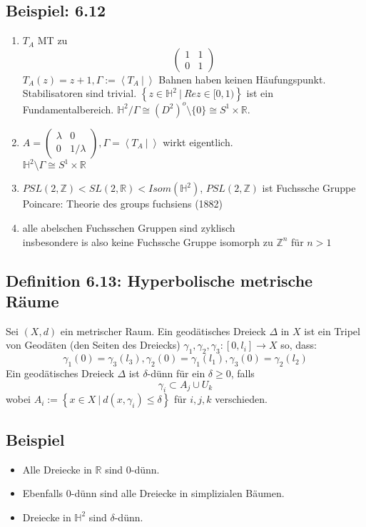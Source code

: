 \documentclass{article}
\newcommand{\Z}{\mathbb{Z}}
\newcommand{\R}{\mathbb{R}}
\renewcommand{\H}{\mathbb{H}}
\newcommand{\set}[2]{\left\lbrace #1~|~#2 \right\rbrace}
\newcommand{\grp}[2]{\left\langle #1~|~#2 \right\rangle}
\newcommand{\Matrix}[4]{\left(\begin{matrix}
		#1 & #2\\
		#3 & #4
	\end{matrix}\right)}
\begin{document}
\subsection{Beispiel: 6.12}
\begin{enumerate}
	\item $T_A$ MT zu 
	\[\Matrix{1}{1}{0}{1} \]
	$T_A(z) = z +1, \Gamma:= \grp{T_A}{}$
	Bahnen haben keinen Häufungspunkt. Stabilisatoren sind trivial. $\set{z \in \H^2}{Re z \in [0,1)}$ ist ein Fundamentalbereich. $\H^2 / \Gamma \cong (D^2)^o\setminus\{0\} \cong S^1\times \R$.
	
	\item $A = \Matrix{\lambda}{0}{0}{1/\lambda}, \Gamma = \grp{T_A}{}$ wirkt eigentlich.\\
	$\H^2\setminus \Gamma \cong S^1\times \R$
	
	\item $PSL(2, \Z) < SL(2, \R) < Isom (\H^2)$, $PSL(2, \Z)$ ist Fuchssche Gruppe\\
	Poincare: Theorie des groups fuchsiens (1882)
	
	\item alle abelschen Fuchsschen Gruppen sind zyklisch\\
	insbesondere is also keine Fuchssche Gruppe isomorph zu $\Z^n$ für $n > 1$
\end{enumerate}

\subsection{Definition 6.13: Hyperbolische metrische Räume}
Sei $(X,d)$ ein metrischer Raum. Ein geodätisches Dreieck $\Delta$ in $X$ ist ein Tripel von Geodäten (den Seiten des Dreiecks) $\gamma_1, \gamma_2,\gamma_3 : [0,l_i] \rightarrow X$ so, dass:
\[\gamma_1(0) = \gamma_3(l_3), \gamma_2(0) = \gamma_1(l_1), \gamma_3(0) = \gamma_2(l_2)\]
Ein geodätisches Dreieck $\Delta$ ist $\delta$-dünn für ein $\delta \geq 0$, falls
\[\gamma_i \subset A_j\cup U_k \]
wobei $A_i := \set{x \in X}{d(x, \gamma_i) \leq \delta}$ für $i,j,k$ verschieden.

\subsection{Beispiel}
\begin{itemize}
	\item Alle Dreiecke in $\R$ sind 0-dünn.
	\item Ebenfalls 0-dünn sind alle Dreiecke in simplizialen Bäumen.
	\item Dreiecke in $\H^2$ sind $\delta$-dünn.
\end{itemize}
\end{document}
